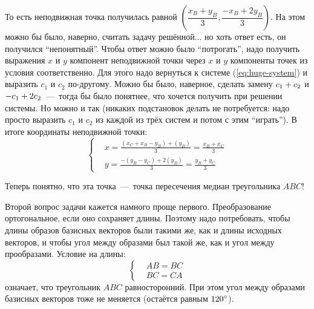 \documentclass[a4paper,12pt]{article}
\begin{document}
\begin{solution}
    То есть неподвижная точка получилась равной $\left(\dfrac{x_B + y_B}{3}, \dfrac{-x_B + 2y_B}{3}\right)$. На этом можно бы было, наверно, считать задачу решённой... но хоть ответ есть, он получился ``непонятный''.
    Чтобы ответ можно было ``потрогать'', надо получить выражения $x$ и $y$ компонент неподвижной точки через $x$ и $y$ компоненты точек из условия соответственно.
    Для этого надо вернуться к системе (\ref{eq:huge-system}) и выразить $c_1$ и $c_2$ по-другому.
    Можно бы было, наверное, сделать замену $c_1 \hm+ c_2$ и $-c_1 \hm+ 2c_2$~---~тогда бы было понятнее, что хочется получить при решении системы.
    Но можно и так (никаких подстановок делать не потребуется: надо просто выразить $c_1$ и $c_2$ из каждой из трёх систем и потом с этим ``играть'').
    В итоге координаты неподвижной точки:
    \[
      \left\{
        \begin{aligned}
          &x = \frac{(x_C + x_B - y_B) + (y_B)}{3} = \frac{x_B + x_C}{3}\\
          &y = \frac{-(y_B - y_C) + 2(y_B)}{3} = \frac{y_B + y_C}{3}
        \end{aligned}
      \right.
    \]
    
    Теперь понятно, что эта точка~---~точка пересечения медиан треугольника $ABC$!
    
    \bigskip
    
    Второй вопрос задачи кажется намного проще первого.
    Преобразование ортогональное, если оно сохраняет длины.
    Поэтому надо потребовать, чтобы длины образов базисных векторов были такими же, как и длины исходных векторов, и чтобы угол между образами был такой же, как и угол между прообразами.
    Условие на длины:
    \[
      \left\{
        \begin{aligned}
          &AB = BC\\
          &BC = CA
        \end{aligned}
      \right.
    \]
    означает, что треугольник $ABC$ равносторонний.
    При этом угол между образами базисных векторов тоже не меняется (остаётся равным $120\degree$).
  \end{solution}
  
\end{document}
